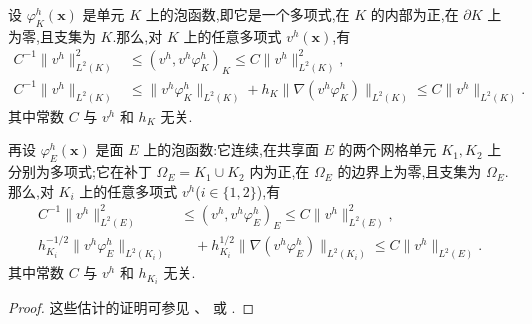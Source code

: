 \begin{lemma}[泡函数的局部估计]\label{lem:stokes-bubble-local-estimates}
设 $\varphi_K^h(\bm{x})$ 是单元 $K$ 上的泡函数,即它是一个多项式,在 $K$ 的内部为正,在 $\partial K$ 上为零,且支集为 $K$.那么,对 $K$ 上的任意多项式 $v^h(\bm{x})$,有
{\fontsize{9.8pt}{12pt}\selectfont
\begin{align}
 C^{-1}\|v^h\|_{L^2(K)}^2
 &\leq (v^h,v^h\varphi_K^h)_K
 \leq C\|v^h\|_{L^2(K)}^2,\label{eq:stokes-cell-bubble-l2}\\
 C^{-1}\|v^h\|_{L^2(K)}
 &\leq \|v^h\varphi_K^h\|_{L^2(K)}
       +h_K\|\nabla(v^h\varphi_K^h)\|_{L^2(K)}
 \leq C\|v^h\|_{L^2(K)}.\label{eq:stokes-cell-bubble-h1}
\end{align}
}
其中常数 $C$ 与 $v^h$ 和 $h_K$ 无关.

再设 $\varphi_E^h(\bm{x})$ 是面 $E$ 上的泡函数:它连续,在共享面 $E$ 的两个网格单元 $K_1,K_2$ 上分别为多项式;它在补丁 $\Omega_E=K_1\cup K_2$ 内为正,在 $\Omega_E$ 的边界上为零,且支集为 $\Omega_E$.那么,对 $K_i$ 上的任意多项式 $v^h$($i\in\{1,2\}$),有
{\small
\begin{align}
 C^{-1}\|v^h\|_{L^2(E)}^2
 &\leq (v^h,v^h\varphi_E^h)_E
 \leq C\|v^h\|_{L^2(E)}^2,\label{eq:stokes-face-bubble-l2}\\
 h_{K_i}^{-1/2}\|v^h\varphi_E^h\|_{L^2(K_i)}
 &\quad+h_{K_i}^{1/2}\|\nabla(v^h\varphi_E^h)\|_{L^2(K_i)}
 \leq C\|v^h\|_{L^2(E)}.\label{eq:stokes-face-bubble-h1}
\end{align}
}
其中常数 $C$ 与 $v^h$ 和 $h_{K_i}$ 无关.
\end{lemma}
\begin{proof}
这些估计的证明可参见 \textcite{Verfuerth1994}、\textcite[定理 2.2、2.4]{AinsworthOden2000} 或 \textcite[命题 1.4]{Verfuerth2013}.
\end{proof}

